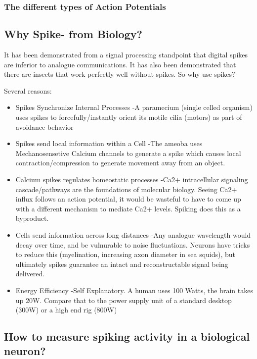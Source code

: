 \documentclass[main]{subfiles}
\begin{document}
\subsubsection{The different types of Action Potentials}

\subsection{Why Spike- from Biology?}
It has been demonstrated from a signal processing standpoint that digital spikes are inferior to analogue communications. It has also been demonstrated that there are insects that work perfectly well without spikes. So why use spikes?

Several reasons:

\begin{itemize}
	\item Spikes Synchronize Internal Processes
	-A paramecium (single celled organism) uses spikes to forcefully/instantly orient its motile cilia (motors) as part of avoidance behavior 
	\item Spikes send local information within a Cell
	-The ameoba uses Mechanosensetive Calcium channels to generate a spike which causes local contraction/compression to generate movement away from an object.
	\item Calcium spikes regulates homeostatic processes
	-Ca2+ intracellular signaling cascade/pathways are the foundations of molecular biology. Seeing Ca2+ influx follows an action potential, it would be wasteful to have to come up with a different mechanism to mediate Ca2+ levels. Spiking does this as a byproduct.
	\item Cells send information across long distances
	-Any analogue wavelength would decay over time, and be vulnurable to noise fluctuations. Neurons have tricks to reduce this (myelination, increasing axon diameter in sea squids), but ultimately spikes guarantee an intact and reconstructable signal being delivered. 
	\item Energy Efficiency
	-Self Explanatory. A human uses 100 Watts, the brain takes up 20W. Compare that to the power supply unit of a standard desktop (300W) or a high end rig (800W)
\end{itemize}


\subsection{How to measure spiking activity in a biological neuron?}
\end{document}
